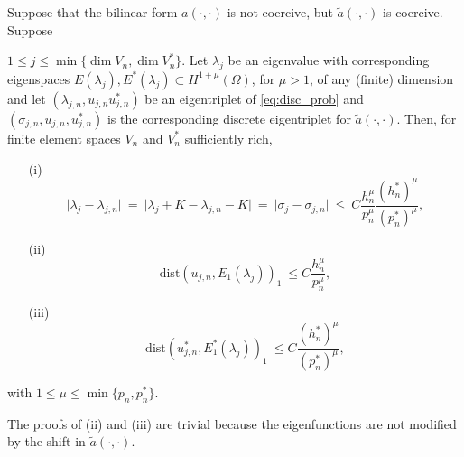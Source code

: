 \documentclass[smallextended]{svjour3}
\begin{document}
\begin{lemma}
\label{lm:adj_2}
Suppose  that the bilinear form $a(\cdot,\cdot)$ is not coercive, but  $\tilde a(\cdot,\cdot)$ is coercive.
Suppose

$ 1 \leq j\leq \min\{\dim V_n,\dim V_n^*\}$. Let
$\lambda_j$ be an eigenvalue with
corresponding eigenspaces $E(\lambda_j),E^*(\lambda_j)\subset H^{1+\mu}(\Omega)$, for $\mu>1$, of any (finite) dimension  and
let $(\lambda_{j,n},u_{j,n}u_{j,n}^*)$ be an  eigentriplet  of \eqref{eq:disc_prob} and $(\sigma_{j,n},u_{j,n},u_{j,n}^*)$ is the corresponding discrete eigentriplet for $\tilde a(\cdot,\cdot)$.
Then, for finite element spaces $V_n$ and $V_n^*$ sufficiently rich,
\begin{itemize}
\item[(i)] 
\begin{equation}\label{eq:supereig_2}
\vert \lambda_j - \lambda_{j,n} \vert\ = \ \vert \lambda_j+K - \lambda_{j,n}-K \vert 
\ = \ \vert \sigma_j - \sigma_{j,n} \vert\ \leq \ C
\frac{h_n^{\mu} }{p_n^{\mu}}\frac{(h_n^*)^{\mu} }{(p_n^*)^{\mu}},
\end{equation}
\item[(ii)] 
\begin{equation}
\label{eq:energy_2} \mathrm{dist}(
u_{j,n},E_1(\lambda_j))_{1} \ \leq
C \frac{h_n^{\mu}}{p_n^{\mu}}, 
\end{equation}
\item[(iii)]
\begin{equation}
\label{eq:energy_dual_2} \mathrm{dist}(
u_{j,n}^*,E_1^*(\lambda_j))_{1} \ \leq
C \frac{(h_n^*)^{\mu}}{(p_n^*)^{\mu}}, 
\end{equation}
\end{itemize}
with $1\leq \mu\leq \min\{p_n,p_n^*\}$.
\end{lemma}

The proofs of (ii) and (iii) are trivial because the eigenfunctions are not modified by the shift in  $\tilde a(\cdot,\cdot)$.

\end{document}
